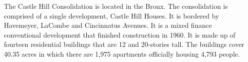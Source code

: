    

    

The Castle Hill Consolidation is located in the Bronx. The consolidation is comprised of a single development, Castle Hill Houses. It is bordered by Havemeyer, LaCombe and Cincinnatus Avenues. It is a mixed finance conventional development that finished construction in 1960. It is made up of fourteen residential buildings that are 12 and 20-stories tall. The buildings cover 40.35 acres in which there are 1,975 apartments officially housing 4,793 people.     